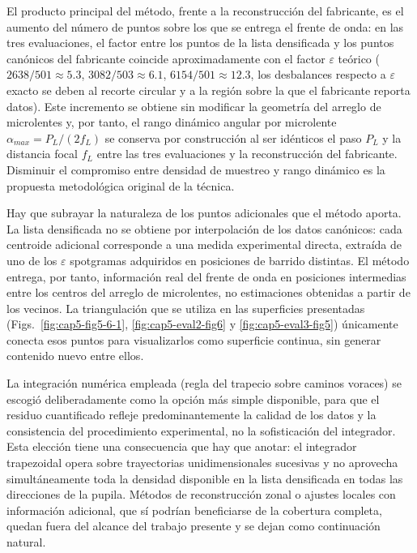 \documentclass[letterpaper,12pt,oneside]{book}
\begin{document}
El producto principal del método, frente a la reconstrucción del fabricante, es el aumento
del número de puntos sobre los que se entrega el frente de onda: en las tres evaluaciones,
el factor entre los puntos de la lista densificada y los puntos canónicos del fabricante
coincide aproximadamente con el factor $\varepsilon$ teórico ($2638/501 \approx 5.3$,
$3082/503 \approx 6.1$, $6154/501 \approx 12.3$, los desbalances respecto a $\varepsilon$
exacto se deben al recorte circular y a la región sobre la que el fabricante reporta
datos). Este incremento se obtiene sin modificar la geometría del arreglo de microlentes
y, por tanto, el rango dinámico angular por microlente $\alpha_{max}=P_L/(2f_L)$ se
conserva por construcción al ser idénticos el paso $P_L$ y la distancia focal $f_L$ entre
las tres evaluaciones y la reconstrucción del fabricante. Disminuir el compromiso entre
densidad de muestreo y rango dinámico es la propuesta metodológica original de la técnica.

Hay que subrayar la naturaleza de los puntos adicionales que el método aporta. La lista
densificada no se obtiene por interpolación de los datos canónicos: cada centroide
adicional corresponde a una medida experimental directa, extraída de uno de los
$\varepsilon$ spotgramas adquiridos en posiciones de barrido distintas. El método entrega,
por tanto, información real del frente de onda en posiciones intermedias entre los centros
del arreglo de microlentes, no estimaciones obtenidas a partir de los vecinos. La
triangulación que se utiliza en las superficies presentadas
(Figs.~\ref{fig:cap5-fig5-6-1}, \ref{fig:cap5-eval2-fig6} y \ref{fig:cap5-eval3-fig5})
únicamente conecta esos puntos para visualizarlos como superficie continua, sin generar
contenido nuevo entre ellos.

La integración numérica empleada (regla del trapecio sobre caminos voraces) se escogió
deliberadamente como la opción más simple disponible, para que el residuo cuantificado
refleje predominantemente la calidad de los datos y la consistencia del procedimiento
experimental, no la sofisticación del integrador. Esta elección tiene una consecuencia que
hay que anotar: el integrador trapezoidal opera sobre trayectorias unidimensionales
sucesivas y no aprovecha simultáneamente toda la densidad disponible en la lista
densificada en todas las direcciones de la pupila. Métodos de reconstrucción zonal o
ajustes locales con información adicional, que sí podrían beneficiarse de la cobertura
completa, quedan fuera del alcance del trabajo presente y se dejan como continuación
natural.
\end{document}
